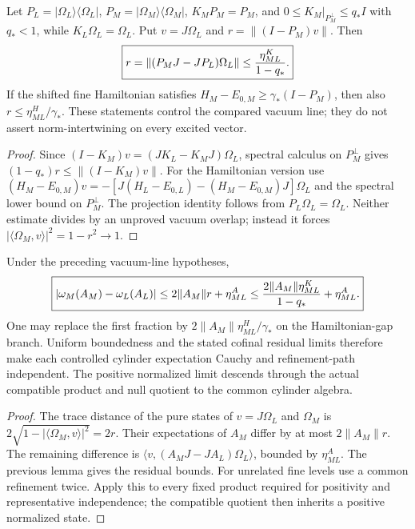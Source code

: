 \documentclass[12pt,a4paper]{article}
\begin{document}
\begin{lemma}
\label{p12:lem:qft4g-projection-stability}
Let $P_L=|\Omega_L\rangle\langle\Omega_L|$,
$P_M=|\Omega_M\rangle\langle\Omega_M|$, $K_M P_M=P_M$, and
$0\le K_M|_{P_M^\perp}\le q_*I$ with $q_*<1$, while $K_L\Omega_L=\Omega_L$.
Put $v=J\Omega_L$ and $r=\|(I-P_M)v\|$. Then
\begin{equation}
\label{p12:eq:qft4g-projection-stability}
 \boxed{r=\|(P_MJ-JP_L)\Omega_L\|
       \le {\eta^K_{ML}\over1-q_*}.}
\end{equation}
If the shifted fine Hamiltonian satisfies
$H_M-E_{0,M}\ge\gamma_*(I-P_M)$, then also
$r\le\eta^H_{ML}/\gamma_*$. These statements control the compared vacuum
line; they do not assert norm-intertwining on every excited vector.
\end{lemma}
\begin{proof}
Since $(I-K_M)v=(JK_L-K_MJ)\Omega_L$, spectral calculus on $P_M^\perp$
gives $(1-q_*)r\le\|(I-K_M)v\|$. For the Hamiltonian version use
$(H_M-E_{0,M})v=-[J(H_L-E_{0,L})-(H_M-E_{0,M})J]\Omega_L$ and the
spectral lower bound on $P_M^\perp$. The projection identity follows from
$P_L\Omega_L=\Omega_L$. Neither estimate divides by an unproved vacuum
overlap; instead it forces $|\langle\Omega_M,v\rangle|^2=1-r^2\to1$.
\end{proof}

\begin{theorem}
\label{p12:thm:qft4hij-local-state-convergence}
Under the preceding vacuum-line hypotheses,
\begin{equation}
\label{p12:eq:qft4h-cauchy-bound}
 \boxed{|\omega_M(A_M)-\omega_L(A_L)|
 \le 2\|A_M\|r+\eta^A_{ML}
 \le {2\|A_M\|\eta^K_{ML}\over1-q_*}+\eta^A_{ML}.}
\end{equation}
One may replace the first fraction by
$2\|A_M\|\eta^H_{ML}/\gamma_*$ on the Hamiltonian-gap branch.
Uniform boundedness and the stated cofinal residual limits therefore make
each controlled cylinder expectation Cauchy and refinement-path independent.
The positive normalized limit descends through the actual compatible product
and null quotient to the common cylinder algebra.
\end{theorem}
\begin{proof}
The trace distance of the pure states of $v=J\Omega_L$ and $\Omega_M$ is
$2\sqrt{1-|\langle\Omega_M,v\rangle|^2}=2r$. Their expectations of $A_M$
differ by at most $2\|A_M\|r$. The remaining difference is
$\langle v,(A_MJ-JA_L)\Omega_L\rangle$, bounded by $\eta^A_{ML}$.
The previous lemma gives the residual bounds. For unrelated fine levels use
a common refinement twice. Apply this to every fixed product required for
positivity and representative independence; the compatible quotient then
inherits a positive normalized state.
\end{proof}
\end{document}
